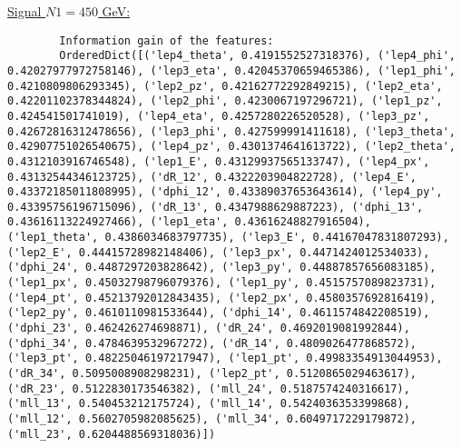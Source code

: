 \documentclass[a4paper, american, 12pt]{report}
\begin{document}
	\underline{Signal $N1=450$ GeV:}
	\begin{lstlisting}
		Information gain of the features:
		OrderedDict([('lep4_theta', 0.4191552527318376), ('lep4_phi', 0.42027977972758146), ('lep3_eta', 0.42045370659465386), ('lep1_phi', 0.4210809806293345), ('lep2_pz', 0.42162772292849215), ('lep2_eta', 0.42201102378344824), ('lep2_phi', 0.4230067197296721), ('lep1_pz', 0.424541501741019), ('lep4_eta', 0.4257280226520528), ('lep3_pz', 0.42672816312478656), ('lep3_phi', 0.427599991411618), ('lep3_theta', 0.42907751026540675), ('lep4_pz', 0.4301374641613722), ('lep2_theta', 0.4312103916746548), ('lep1_E', 0.43129937565133747), ('lep4_px', 0.43132544346123725), ('dR_12', 0.4322203904822728), ('lep4_E', 0.43372185011808995), ('dphi_12', 0.43389037653643614), ('lep4_py', 0.43395756196715096), ('dR_13', 0.4347988629887223), ('dphi_13', 0.43616113224927466), ('lep1_eta', 0.43616248827916504), ('lep1_theta', 0.4386034683797735), ('lep3_E', 0.44167047831807293), ('lep2_E', 0.44415728982148406), ('lep3_px', 0.4471424012534033), ('dphi_24', 0.4487297203828642), ('lep3_py', 0.44887857656083185), ('lep1_px', 0.45032798796079376), ('lep1_py', 0.4515757089823731), ('lep4_pt', 0.45213792012843435), ('lep2_px', 0.4580357692816419), ('lep2_py', 0.4610110981533644), ('dphi_14', 0.4611574842208519), ('dphi_23', 0.462426274698871), ('dR_24', 0.4692019081992844), ('dphi_34', 0.4784639532967272), ('dR_14', 0.4809026477868572), ('lep3_pt', 0.48225046197217947), ('lep1_pt', 0.49983354913044953), ('dR_34', 0.5095008908298231), ('lep2_pt', 0.5120865029463617), ('dR_23', 0.5122830173546382), ('mll_24', 0.5187574240316617), ('mll_13', 0.540453212175724), ('mll_14', 0.5424036353399868), ('mll_12', 0.5602705982085625), ('mll_34', 0.6049717229179872), ('mll_23', 0.6204488569318036)])
	\end{lstlisting}
	
	
	

	\printglossary[type=\acronymtype]
	
	

	
	
\end{document}
